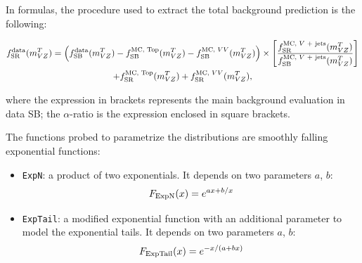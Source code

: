 \noindent In formulas, the procedure used to extract the total background prediction is the following:



\begin{equation}
\begin{gathered}
  f_{\text{SR}}^{\text{data}}(\mtVZ) = \left( f_{\text{SB}}^{\text{data}}(\mtVZ) - f_{\text{SB}}^{\text{MC, Top}}(\mtVZ) - f_{\text{SB}}^{\text{MC, \VV}}(\mtVZ) \right) \times \left[ \frac{f_{\text{SR}}^{\text{MC, \V + jets}}(\mtVZ)}{f_{\text{SB}}^{\text{MC, \V + jets}}(\mtVZ)} \right] \\
  + f_{\text{SR}}^{\text{MC, Top}}(\mtVZ) + f_{\text{SR}}^{\text{MC, \VV}}(\mtVZ), \\
\end{gathered}
\label{eq:shape_3}
\end{equation}

\noindent where the expression in brackets represents the main background evaluation in data SB; the $\alpha$-ratio is the expression enclosed in square brackets.

\noindent The functions probed to parametrize the \mtVZ distributions are smoothly falling exponential functions:

\begin{itemize}
  \item {\tt ExpN}: a product of two exponentials. It depends on two parameters $a$, $b$: $$F_{\rm ExpN}(x) = e^{ax+b/x}$$
  \item {\tt ExpTail}: a modified exponential function with an additional parameter to model the exponential tails. It depends on two parameters $a$, $b$: $$F_{\rm ExpTail}(x) = e^{-x/(a+bx)}$$
\end{itemize}

